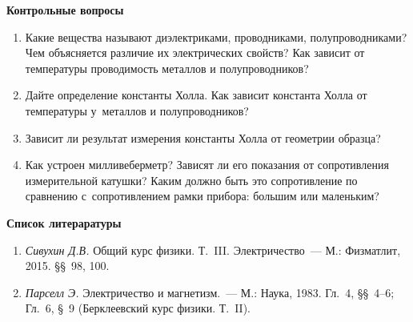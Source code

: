 {\small

{\bf \Large Контрольные вопросы}

\begin{enumerate}

\item{ Какие вещества называют диэлектриками, проводниками, полупроводниками? Чем объясняется различие их электрических свойств? Как зависит от температуры проводимость металлов и полупроводников?}

\item{ Дайте определение константы Холла. Как зависит константа Холла от температуры у~металлов и полупроводников?}

\item{ Зависит ли результат измерения константы Холла от геометрии образца?}

\item{ Как устроен милливеберметр? Зависят ли его показания от сопротивления измерительной катушки? Каким должно быть это сопротивление по сравнению с~сопротивлением рамки прибора: большим или маленьким?}

\end{enumerate}

{\bf \Large Список литераратуры}

\begin{enumerate}


\item{ \emph{Сивухин Д.В.} Общий курс физики. Т.~III. Электричество~--- М.: Физматлит, 2015. \S\S~98, 100.}

\item{ \emph{Парселл Э.} Электричество и магнетизм.~--- М.: Наука, 1983. Гл.~4, \S\S~4--6; Гл.~6, \S~9 (Берклеевский курс физики. Т.~II).}
\end{enumerate}

}


